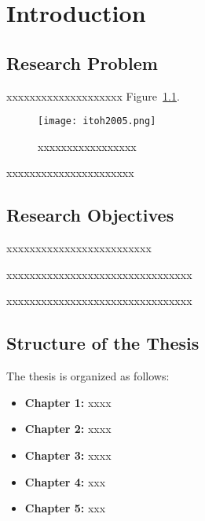 
\chapter{Introduction}

\section{Research Problem}

xxxxxxxxxxxxxxxxxxxx Figure~\ref{fig:itoh2005}.
\begin{figure}[h]
  \centering
  \texttt{[image: itoh2005.png]}
  \caption{xxxxxxxxxxxxxxxxx}
  \label{fig:itoh2005}
\end{figure}

xxxxxxxxxxxxxxxxxxxxxx

\section{Research Objectives}
xxxxxxxxxxxxxxxxxxxxxxxxx

xxxxxxxxxxxxxxxxxxxxxxxxxxxxxxxx

xxxxxxxxxxxxxxxxxxxxxxxxxxxxxxxx


\section{Structure of the Thesis}
The thesis is organized as follows:

\begin{itemize}
  \item \textbf{Chapter 1:} xxxx
  \item \textbf{Chapter 2:} xxxx
  \item \textbf{Chapter 3:} xxxx
  \item \textbf{Chapter 4:} xxx
  \item \textbf{Chapter 5:} xxx
\end{itemize}


